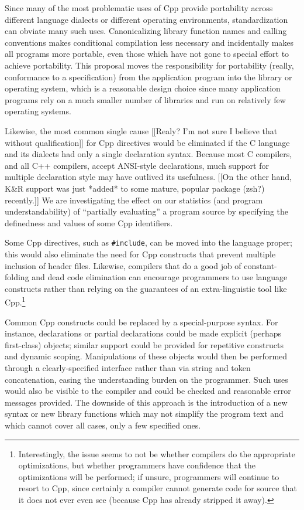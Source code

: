 \documentclass[11pt]{article}
\begin{document}
Since many of the most problematic uses of Cpp provide portability across
different language dialects or different operating environments,
standardization can obviate many such uses.  Canonicalizing library
function names and calling conventions makes conditional compilation less
necessary and incidentally makes all programs more portable, even those
which have not gone to special effort to achieve portability.  This
proposal moves the responsibility for portability (really, conformance to a
specification) from the application program into the library or operating
system, which is a reasonable design choice since many application programs
rely on a much smaller number of libraries and run on relatively few
operating systems.

Likewise, the most common single cause [[Realy?  I'm not sure I believe
that without qualification]] for Cpp directives would be eliminated if the
C language and its dialects had only a single declaration syntax.  Because
most C compilers, and all C++ compilers, accept ANSI-style declarations,
much support for multiple declaration style may have outlived its
usefulness.  [[On the other hand, K\&R support was just *added* to some
mature, popular package (zsh?) recently.]]  We are investigating the effect
on our statistics (and program understandability) of ``partially
evaluating'' a program source by specifying the definedness and values of
some Cpp identifiers.

Some Cpp directives, such as {\tt \#include}, can be moved into the
language proper; this would also eliminate the need for Cpp constructs that
prevent multiple inclusion of header files.  Likewise, compilers that do a
good job of constant-folding and dead code elimination can encourage
programmers to use language constructs rather than relying on the
guarantees of an extra-linguistic tool like Cpp.\footnote{Interestingly,
  the issue seems to not be whether compilers do the appropriate
  optimizations, but whether programmers have confidence that the
  optimizations will be performed; if unsure, programmers will continue to
  resort to Cpp, since certainly a compiler cannot generate code for source
  that it does not ever even see (because Cpp has already stripped it
  away).}

Common Cpp constructs could be replaced by a special-purpose syntax.  For
instance, declarations or partial declarations could be made explicit
(perhaps first-class) objects; similar support could be provided for
repetitive constructs and dynamic scoping.  Manipulations of these objects
would then be performed through a clearly-specified interface rather than
via string and token concatenation, easing the understanding burden on the
programmer.  Such uses would also be visible to the compiler and could be
checked and reasonable error messages provided.  The downside of this
approach is the introduction of a new syntax or new library functions which
may not simplify the program text and which cannot cover all cases, only a
few specified ones.
\end{document}
